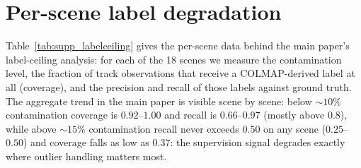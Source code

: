 \documentclass[10pt,twocolumn,letterpaper]{article}
\begin{document}
\section{Per-scene label degradation}\label{sec:labelceiling}
Table~\ref{tab:supp_labelceiling} gives the per-scene data behind the main paper's
label-ceiling analysis: for each of the 18 scenes we measure the contamination level, the
fraction of track observations that receive a COLMAP-derived label at all (coverage), and
the precision and recall of those labels against ground truth. The aggregate trend in the main paper is visible scene by scene: below ${\sim}10\%$ contamination coverage is $0.92$--$1.00$ and recall is $0.66$--$0.97$ (mostly above $0.8$), while above ${\sim}15\%$ contamination recall never exceeds $0.50$ on any scene ($0.25$--$0.50$) and coverage falls as low as $0.37$: the supervision signal degrades exactly where outlier handling matters most.
\end{document}
